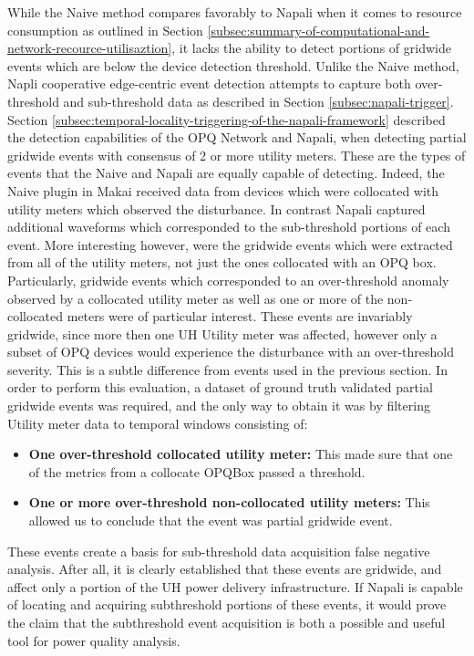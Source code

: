 While the Naive method compares favorably to Napali when it comes to resource consumption as outlined in Section \ref{subsec:summary-of-computational-and-network-recource-utilisaztion}, it lacks the ability to detect portions of gridwide events which are below the device detection threshold.
Unlike the Naive method, Napli cooperative edge-centric event detection attempts to capture both over-threshold and sub-threshold data as described in Section \ref{subsec:napali-trigger}.
Section \ref{subsec:temporal-locality-triggering-of-the-napali-framework} described the detection capabilities of the OPQ Network and Napali, when detecting partial gridwide events with consensus of 2 or more utility meters.
These are the types of events that the Naive and Napali are equally capable of detecting.
Indeed, the Naive plugin in Makai received data from devices which were collocated with utility meters which observed the disturbance.
In contrast Napali  captured additional waveforms which corresponded to the sub-threshold portions of each event.
More interesting however, were the gridwide events which were extracted from all of the utility meters, not just the ones collocated with an OPQ box.
Particularly, gridwide events which corresponded to an over-threshold anomaly observed by a collocated utility meter as well as one or more of the non-collocated meters were of particular interest.
These events are invariably gridwide, since more then one UH Utility meter was affected, however only a subset of OPQ devices would experience the disturbance with an over-threshold severity.
This is a subtle difference from events used in the previous section.
In order to perform this evaluation, a dataset of ground truth validated partial gridwide events was required, and the only way to obtain it was by filtering Utility meter data to temporal windows consisting of:
\begin{itemize}
    \item \textbf{One over-threshold collocated utility meter:} This made sure that one of the metrics from a collocate OPQBox passed a threshold.
    \item \textbf{One or more over-threshold non-collocated utility meters:} This allowed us to conclude that the event was partial gridwide event.
\end{itemize}
These events create a basis for sub-threshold data acquisition false negative analysis.
After all, it is clearly established that these events are gridwide, and affect only a portion of the UH power delivery infrastructure.
If Napali is capable of locating and acquiring subthreshold portions of these events, it would prove the claim that the subthreshold event acquisition is both a possible and useful tool for power quality analysis.

